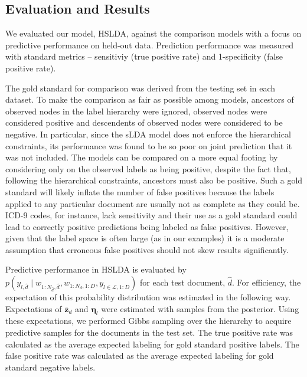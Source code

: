 \subsection{Evaluation and Results}


We evaluated our model, HSLDA, against the comparison models with a focus on
predictive performance on held-out data. Prediction performance was measured
with standard metrics -- sensitiviy (true positive rate) and 1-specificity
(false positive rate). 

The gold standard for comparison was derived from the testing set in each
dataset. To make the comparison as fair as possible among models, ancestors of
observed nodes in the label hierarchy were ignored, observed nodes were
considered positive and descendents of observed nodes were considered to be
negative. In particular, since the sLDA model does not enforce the hierarchical
constraints, its performance was found to be so poor on joint prediction that
it was not included. The models can be compared on a more equal footing by
considering only on the observed labels as being positive, despite the fact
that, following the hierarchical constraints, ancestors must also be positive.
Such a gold standard will likely inflate the number of false positives because
the labels applied to any particular document are usually not as complete as
they could be.  ICD-9 codes, for instance, lack sensitivity and their use as a
gold standard could lead to correctly positive predictions being labeled as
false positives\citep{Birmetal2005}. 
However, given that the label space is often large (as in our examples) it is a
moderate assumption that erroneous false positives should not skew results
significantly. 

Predictive performance in HSLDA is evaluated by $p\left(y_{l,\hat{d}}\mid w_{1:N_{\hat{d}},\hat{d}}, w_{1:N_d,1:D},  y_{l\in\mathcal{L},1:D}\right)$ 
for each test document, $\hat{d}$. For efficiency, the expectation of this
probability distribution was estimated in the following way. Expectations 
of $\mathbf{\bar{z}}_d$ and $\boldsymbol{\eta}_l$ were estimated with samples
from the posterior. Using these expectations, we performed Gibbs sampling over
the hierarchy to acquire predictive samples for the documents in the test set.
The true positive rate was calculated as the average expected labeling for
gold standard positive labels. The false positive rate was calculated 
as the average expected labeling for gold standard negative labels.

